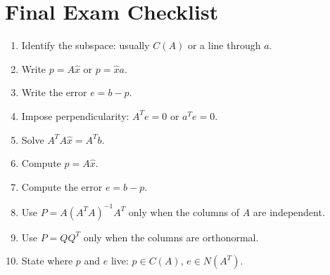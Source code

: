 \documentclass[10pt]{article}
\begin{document}
\section{Final Exam Checklist}

\begin{enumerate}
  \item Identify the subspace: usually \(C(A)\) or a line through \(a\).
  \item Write \(p=A\hat{x}\) or \(p=\hat{x}a\).
  \item Write the error \(e=b-p\).
  \item Impose perpendicularity: \(A^{T}e=0\) or \(a^{T}e=0\).
  \item Solve \(A^{T}A\hat{x}=A^{T}b\).
  \item Compute \(p=A\hat{x}\).
  \item Compute the error \(e=b-p\).
  \item Use \(P=A(A^{T}A)^{-1}A^{T}\) only when the columns of \(A\) are independent.
  \item Use \(P=QQ^{T}\) only when the columns are orthonormal.
  \item State where \(p\) and \(e\) live: \(p\in C(A)\), \(e\in N(A^{T})\).
\end{enumerate}
\end{document}
